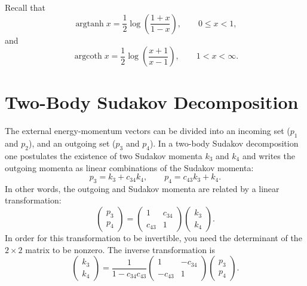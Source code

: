 Recall that
\begin{equation}
	\operatorname{argtanh}{x} = \frac{1}{2} \log{\left( \frac{1 + x}{1 - x} \right)}, \qquad 0 \leq x < 1,
\end{equation}
and
\begin{equation}
	\operatorname{argcoth}{x} = \frac{1}{2} \log{\left( \frac{x + 1}{x - 1} \right)}, \qquad 1 < x < \infty.
\end{equation}
\section{Two-Body Sudakov Decomposition}
The external energy-momentum vectors can be divided into an incoming set ($p_{1}$ and $p_{2}$), and an outgoing set ($p_{3}$ and $p_{4}$). In a two-body Sudakov decomposition one postulates the existence of two Sudakov momenta $k_{3}$ and $k_{4}$ and writes the outgoing momenta as linear combinations of the Sudakov momenta:
\begin{equation}
	p_{3} = k_{3} + c_{34} k_{4}, \qquad p_{4} = c_{43} k_{3} + k_{4}.
\end{equation}
In other words, the outgoing and Sudakov momenta are related by a linear transformation:
\begin{equation}
	\begin{pmatrix} p_{3} \\
	p_{4} \end{pmatrix} = \begin{pmatrix} 1 & c_{34} \\
	c_{43} & 1 \end{pmatrix} \begin{pmatrix} k_{3} \\
	k_{4} \end{pmatrix}.
\end{equation}
In order for this transformation to be invertible, you need the determinant of the $2 \times 2$ matrix to be nonzero. The inverse transformation is
\begin{equation}
	\begin{pmatrix} k_{3} \\
	k_{4} \end{pmatrix} = \frac{1}{1 - c_{34} c_{43}} \begin{pmatrix} 1 & -c_{34} \\
	-c_{43} & 1 \end{pmatrix} \begin{pmatrix} p_{3} \\
	p_{4} \end{pmatrix}.
\end{equation}
